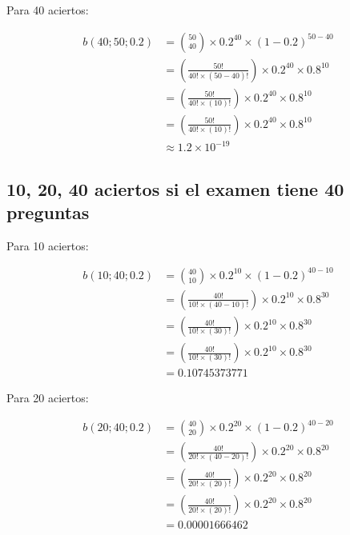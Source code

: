 \documentclass[letterpaper,12pt]{memoir}
\theoremstyle{definition}
\begin{document}
Para 40 aciertos:

\begin{equation*}
  \begin{split}
  b(40;50;0.2)&={50\choose 40} \times 0.2^{40} \times (1 - 0.2)^{50-40}\\
  &=(\frac{50!}{40!\times(50-40)!}) \times 0.2^{40} \times 0.8^{10}\\
  &=(\frac{50!}{40!\times(10)!}) \times 0.2^{40} \times 0.8^{10}\\
  &=(\frac{50!}{40!\times(10)!}) \times 0.2^{40} \times 0.8^{10}\\
  &\approx 1.2 \times 10^{-19}
  \end{split} 
\end{equation*}

\subsection*{10, 20, 40 aciertos si el examen tiene 40 preguntas}

Para 10 aciertos:

\begin{equation*}
  \begin{split}
  b(10;40;0.2)&={40\choose 10} \times 0.2^{10} \times (1 - 0.2)^{40-10}\\
  &=(\frac{40!}{10!\times(40-10)!}) \times 0.2^{10} \times 0.8^{30}\\
  &=(\frac{40!}{10!\times(30)!}) \times 0.2^{10} \times 0.8^{30}\\
  &=(\frac{40!}{10!\times(30)!}) \times 0.2^{10} \times 0.8^{30}\\
  &= 0.10745373771
  \end{split} 
\end{equation*}

Para 20 aciertos:

\begin{equation*}
  \begin{split}
  b(20;40;0.2)&={40\choose 20} \times 0.2^{20} \times (1 - 0.2)^{40-20}\\
  &=(\frac{40!}{20!\times(40-20)!}) \times 0.2^{20} \times 0.8^{20}\\
  &=(\frac{40!}{20!\times(20)!}) \times 0.2^{20} \times 0.8^{20}\\
  &=(\frac{40!}{20!\times(20)!}) \times 0.2^{20} \times 0.8^{20}\\
  &= 0.00001666462
  \end{split} 
\end{equation*}
\end{document}
